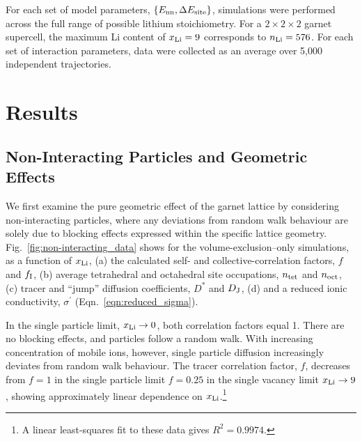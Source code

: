 \documentclass[aps,prb,twocolumn,superscriptaddress,reprint]{revtex4-1}
\newcommand{\set}[1]{\left\{#1\right\}}
\newcommand{\xLi}{x_\m{Li}}
\begin{document}
For each set of model parameters, $\set{E_\m{nn}, \Delta E_\m{site}}$, simulations were performed across the full range of possible lithium stoichiometry. For a $2\times2\times2$ garnet supercell, the maximum Li content of $\xLi=9$ corresponds to $n_{\mathrm{Li}}=576$. 
For each set of interaction parameters, data were collected as an average over 5,000 independent trajectories. 

\section{Results}
\subsection{Non-Interacting Particles and Geometric Effects}

We first examine the pure geometric effect of the garnet lattice by considering non-interacting particles, where any deviations from random walk behaviour are solely due to blocking effects expressed within the specific lattice geometry. 
Fig.~\ref{fig:non-interacting_data}  shows for the volume-exclusion--only simulations, as a function of $\xLi$, (a) the calculated self- and collective-correlation factors, $f$ and $f_{\mathrm{I}}$, (b) average tetrahedral and octahedral site occupations, $n_{\mathrm{tet}}$ and $n_{\mathrm{oct}}$, (c) tracer and ``jump'' diffusion coefficients, $D^*$ and $D_{\mathrm{J}}$, (d) and a reduced ionic conductivity, $\sigma^\prime$ (Eqn.~\ref{eqn:reduced_sigma}).

In the single particle limit, $\xLi\to0$, both correlation factors equal 1. There are no blocking effects, and particles follow a random walk. 
With increasing concentration of mobile ions, however, single particle diffusion increasingly deviates from random walk behaviour. 
The tracer correlation factor, $f$, decreases from $f=1$ in the single particle limit  $f=0.25$ in the single vacancy limit $\xLi\to9$, showing approximately linear dependence on $\xLi$.\footnote{A linear least-squares fit to these data gives $R^2=0.9974$.}
\end{document}
